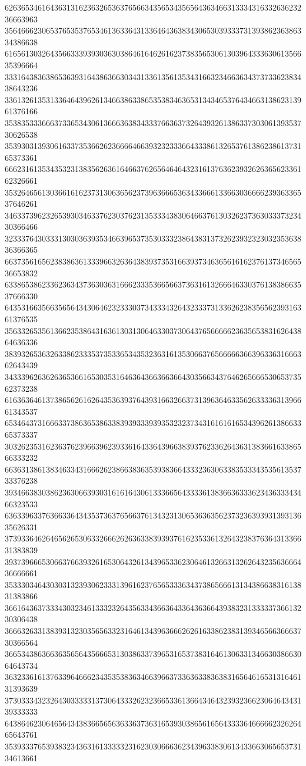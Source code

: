 62636534616436313162363265363765663435653435656436346631333431633263623236663963
35646662306537653537653461363364313364643638343065303933373139386236386334386638
61656130326435663339393036303864616462616237383565306130396433363061356635396664
33316438363865363931643863663034313361356135343166323466363437373362383438643236
33613261353133646439626134663863386535383463653134346537643466313862313961376166
35383533366637336534306136663638343337663637326439326138633730306139353730626538
35393031393061633735366262366664663932323336643338613265376138623861373165373361
66623161353435323138356263616466376265646464323161376362393262636562336162326661
35326465613036616162373130636562373963666536343366613366303666623936336537646261
34633739623265393034633762303762313533343830646637613032623736303337323430366466
32333764303331303036393534663965373530333238643831373262393232303235363836366365
66373561656238386361333966326364383937353166393734636561616237613734656536653832
63386538623362363437363036316662333536656637363161326664633037613838663537666330
64353166356635656434306462323330373433343264323337313362623835656239316361376535
35633265356136623538643163613031306463303730643765666662363565383162643864636336
38393265363263386233353735336534353236316135306637656666636639633631666362643439
34333962636263653661653035316463643663663664303566343764626566653065373562373238
61636364613738656261626435363937643931663266373139636463356263333631396661343537
65346437316663373863653863383939333939353232373431616161653439626138663365373337
30326235316236376239663962393361643364396638393762336264363138366163386566333232
66363138613834633431666262386638363539383664333236306338353334353561353733376238
39346638303862363066393031616164306133366564333361383663633362343633343466323533
63633963376366336434353736376566376134323130653636356237323639393139313635626331
37393364626465626530633266626263633839393761623533613264323837636431336631383839
39373966653066376639326165306432613439653362306461326631326264323563666436666661
35333034643030313239306233313961623765653336343738656661313438663831613831383866
36616436373334303234613332326435633436636433643636643938323133333736613230306438
36663263313839313230356563323164613439636662626163386238313934656636663730366564
36653438636636356564356665313038633739653165373831646130633134663038663064643734
36323361613763396466623435353836346639663733636338363831656461653131646131393639
37303334323264303333313730643332623236653361366434643239323662306464343139333333
64386462306465643438366565636336373631653930386561656433336466666232626465643761
35393337653938323436316133333231623030666362343963383061343366306565373134613661
